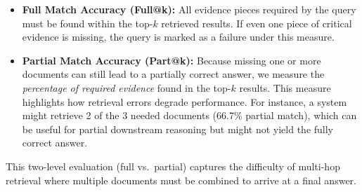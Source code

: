\begin{itemize}
    \item \textbf{Full Match Accuracy (Full@k):} All evidence pieces required by the query must be found 
    within the top-$k$ retrieved results. If even one piece of critical evidence is missing, 
    the query is marked as a failure under this measure.

    \item \textbf{Partial Match Accuracy (Part@k):} Because missing one or more documents can still lead to a partially correct answer, 
    we measure the \emph{percentage of required evidence} found in the top-$k$ results. This measure 
    highlights how retrieval errors degrade performance. For instance, a system might retrieve 2 of the 3 
    needed documents (66.7\% partial match), which can be useful for partial downstream reasoning but might 
    not yield the fully correct answer.
\end{itemize}

This two-level evaluation (full vs.\ partial) captures the difficulty of multi-hop retrieval 
where multiple documents must be combined to arrive at a final answer.